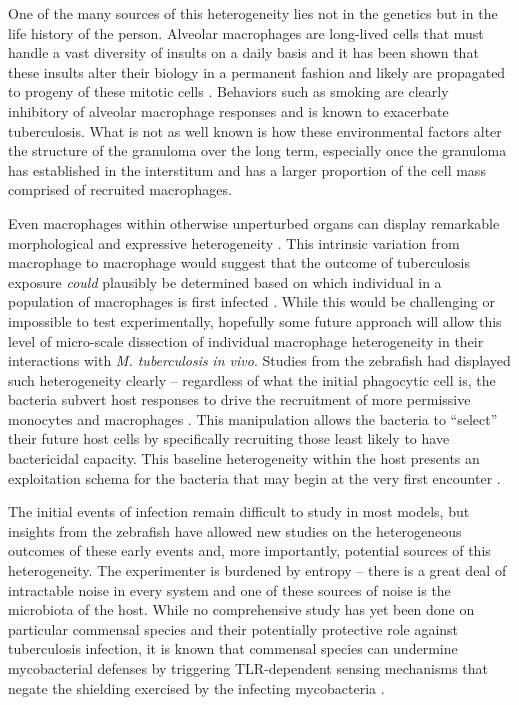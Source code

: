 One of the many sources of this heterogeneity lies not in the genetics but in the life history of the person. Alveolar macrophages are long\hyp{}lived cells that must handle a vast diversity of insults on a daily basis and it has been shown that these insults alter their biology in a permanent fashion and likely are propagated to progeny of these mitotic cells \citep{Gonzalez2017, Duan2017, Berg2016, Glickman2016, Woodruff2005, Hodge2007}. Behaviors such as smoking are clearly inhibitory of alveolar macrophage responses and is known to exacerbate tuberculosis. What is not as well known is how these environmental factors alter the structure of the granuloma over the long term, especially once the granuloma has established in the interstitum and has a larger proportion of the cell mass comprised of recruited macrophages.

Even macrophages within otherwise unperturbed organs can display remarkable morphological and expressive heterogeneity \citep{Gordon2017, Gordon2005a}. This intrinsic variation from macrophage to macrophage would suggest that the outcome of tuberculosis exposure \textit{could} plausibly be determined based on which individual in a population of macrophages is first infected \citep{Verrall2014}. While this would be challenging or impossible to test experimentally, hopefully some future approach will allow this level of micro\hyp{}scale dissection of individual macrophage heterogeneity in their interactions with \textit{M. tuberculosis} \textit{in vivo}. Studies from the zebrafish had displayed such heterogeneity clearly -- regardless of what the initial phagocytic cell is, the bacteria subvert host responses to drive the recruitment of more permissive monocytes and macrophages \citep{Cambier2014b}. This manipulation allows the bacteria to ``select'' their future host cells by specifically recruiting those least likely to have bactericidal capacity. This baseline heterogeneity within the host presents an exploitation schema for the bacteria that may begin at the very first encounter \citep{Ramakrishnan2013b}.

The initial events of infection remain difficult to study in most models, but insights from the zebrafish have allowed new studies on the heterogeneous outcomes of these early events and, more importantly, potential sources of this heterogeneity. The experimenter is burdened by entropy -- there is a great deal of intractable noise in every system and one of these sources of noise is the microbiota of the host. While no comprehensive study has yet been done on particular commensal species and their potentially protective role against tuberculosis infection, it is known that commensal species can undermine mycobacterial defenses by triggering TLR\hyp{}dependent sensing mechanisms that negate the shielding exercised by the infecting mycobacteria \citep{Ramakrishnan2013b, Cambier2014b}.


